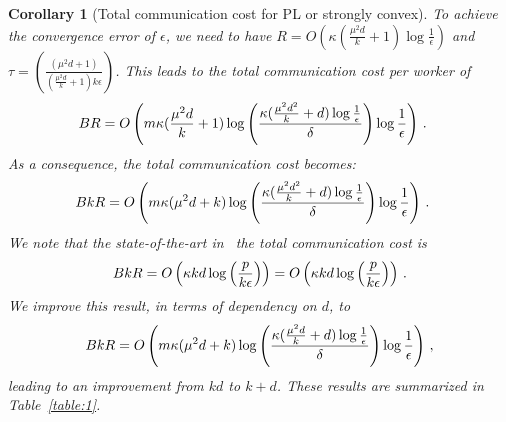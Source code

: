 \documentclass[twoside]{article}
\newcommand{\todo}[1]{\textcolor{red}{ToDo:~#1}}
\newtheorem{corollary}{Corollary}
\begin{document}
\begin{corollary}[Total communication cost for PL or strongly convex]
To achieve the convergence error of $\epsilon$, we need to have $R=O\left(\kappa(\frac{\mu^2d}{k}+1)\log\frac{1}{\epsilon}\right)$ and $\tau=\left(\frac{(\mu^2d+1)}{(\frac{\mu^2d}{k}+1)k\epsilon}\right)$. This leads to the total communication cost per worker of 
\begin{align}\notag
BR&=O\left(m\kappa(\frac{\mu^2d}{k}+1)\log\left(\frac{\kappa(\frac{\mu^2d^2}{k}+d)\log\frac{1}{\epsilon}}{\delta}\right)\log\frac{1}{\epsilon} \right) \, .
\end{align}
As a consequence, the total communication cost becomes:
\begin{align}\notag
BkR&=O\left(m\kappa(\mu^2d+k)\log\left(\frac{\kappa(\frac{\mu^2d^2}{k}+d)\log\frac{1}{\epsilon}}{\delta}\right)\log\frac{1}{\epsilon} \right) \, .
\end{align}
We note that the state-of-the-art in~\cite{karimireddy2019scaffold} the total communication cost is 
\begin{align}\notag
    BkR=O\left(\kappa kd\log\left(\frac{p}{k\epsilon}\right) \right)=O\left(\kappa kd\log\left(\frac{p}{k\epsilon}\right)\right)  \, .
\end{align}
We improve this result, in terms of dependency on $d$, to 
\begin{align}\notag
    BkR=O\left(m\kappa(\mu^2d+k)\log\left(\frac{\kappa(\frac{\mu^2d}{k}+d)\log\frac{1}{\epsilon}}{\delta}\right)\log\frac{1}{\epsilon} \right)\, ,
\end{align}
leading to an improvement from $kd$ to $k+d$. These results are summarized in Table~\ref{table:1}.
\end{corollary}


\end{document}
